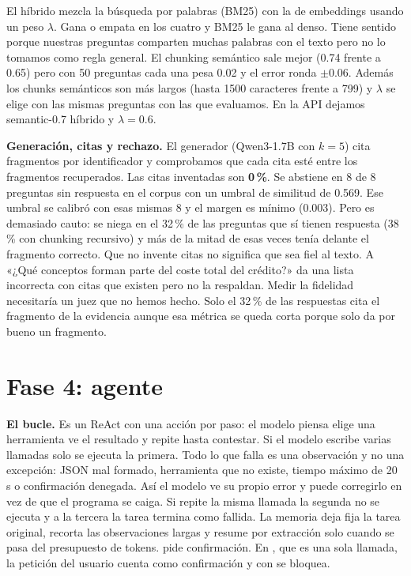 \documentclass[10pt,a4paper]{article}
\newcommand{\code}[1]{\texttt{\detokenize{#1}}}
\begin{document}
El híbrido mezcla la búsqueda por palabras (BM25) con la de embeddings usando un peso $\lambda$. Gana o empata en los cuatro y BM25 le gana al denso. Tiene sentido porque nuestras preguntas comparten muchas palabras con el texto pero no lo tomamos como regla general.
El chunking semántico sale mejor (0.74 frente a 0.65) pero con 50 preguntas cada una pesa 0.02 y el error ronda $\pm$0.06. Además los chunks semánticos son más largos (hasta 1500 caracteres frente a 799)
y $\lambda$ se elige con las mismas preguntas con las que evaluamos. En la API dejamos semantic-0.7 híbrido y $\lambda=0.6$.

\textbf{Generación, citas y rechazo.} El generador (Qwen3-1.7B con $k=5$) cita fragmentos por identificador y comprobamos que cada cita esté entre los fragmentos recuperados. Las citas inventadas son \textbf{0\,\%}.
Se abstiene en 8 de 8 preguntas sin respuesta en el corpus con un umbral de similitud de 0.569. Ese umbral se calibró con esas mismas 8 y el margen es mínimo (0.003).
Pero es demasiado cauto: se niega en el 32\,\% de las preguntas que sí tienen respuesta (38\,\% con chunking recursivo) y más de la mitad de esas veces tenía delante el fragmento correcto.
Que no invente citas no significa que sea fiel al texto. A «¿Qué conceptos forman parte del coste total del crédito?» da una lista incorrecta con citas que existen pero no la respaldan.
Medir la fidelidad necesitaría un juez que no hemos hecho. Solo el 32\,\% de las respuestas cita el fragmento de la evidencia aunque esa métrica se queda corta porque solo da por bueno un fragmento.

\section{Fase 4: agente}
\textbf{El bucle.} Es un ReAct con una acción por paso: el modelo piensa elige una herramienta ve el resultado y repite hasta contestar. Si el modelo escribe varias llamadas solo se ejecuta la primera. Todo lo que falla es una observación y no una excepción: JSON mal formado, herramienta que no existe, tiempo máximo de 20 s o confirmación denegada.
Así el modelo ve su propio error y puede corregirlo en vez de que el programa se caiga. Si repite la misma llamada la segunda no se ejecuta y a la tercera la tarea termina como fallida. La memoria deja fija la tarea original, recorta las observaciones largas y resume por extracción solo cuando se pasa del presupuesto de tokens.
\code{save_credit_report} pide confirmación. En \code{/agent}, que es una sola llamada, la petición del usuario cuenta como confirmación y con \code{ARCA_AGENT_CONFIRM=deny} se bloquea.
\end{document}
